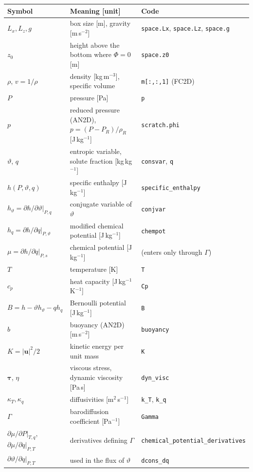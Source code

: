 \documentclass[11pt,a4paper]{article}
\newcommand{\vt}{\vartheta}                    %
\newcommand{\bu}{\mathbf{u}}
\newcommand{\btau}{\boldsymbol{\tau}}
\newcommand{\code}[1]{\texttt{#1}}
\begin{document}
\begin{table}[ht]
\centering\small
\begin{tabular}{p{4.3cm}p{6.0cm}p{4.9cm}}
\hline
Symbol & Meaning [unit] & Code \\ \hline
$L_x,L_z,g$ & box size [m], gravity [m\,s$^{-2}$] & \code{space.Lx}, \code{space.Lz}, \code{space.g} \\
$z_0$ & height above the bottom where $\Phi=0$ [m] & \code{space.z0} \\
$\rho$, $v=1/\rho$ & density [kg\,m$^{-3}$], specific volume & \code{m[:,:,1]} (FC2D) \\
$P$ & pressure [Pa] & \code{p} \\
$p$ & reduced pressure (AN2D), $p=(P-P_R)/\rho_R$ [J\,kg$^{-1}$] & \code{scratch.phi} \\
$\vt$, $q$ & entropic variable, solute fraction [kg\,kg$^{-1}$] & \code{consvar}, \code{q} \\
$h(P,\vt,q)$ & specific enthalpy [J\,kg$^{-1}$] & \code{specific\_enthalpy} \\
$h_\vt=\partial h/\partial\vt|_{P,q}$ & conjugate variable of $\vt$ & \code{conjvar} \\
$h_q=\partial h/\partial q|_{P,\vt}$ & modified chemical potential [J\,kg$^{-1}$] & \code{chempot} \\
$\mu=\partial h/\partial q|_{P,s}$ & chemical potential [J\,kg$^{-1}$] & (enters only through $\Gamma$) \\
$T$ & temperature [K] & \code{T} \\
$c_p$ & heat capacity [J\,kg$^{-1}$K$^{-1}$] & \code{Cp} \\
$B=h-\vt h_\vt-q h_q$ & Bernoulli potential [J\,kg$^{-1}$] & \code{B} \\
$b$ & buoyancy (AN2D) [m\,s$^{-2}$] & \code{buoyancy} \\
$K=|\bu|^2/2$ & kinetic energy per unit mass & \code{K} \\
$\btau$, $\eta$ & viscous stress, dynamic viscosity [Pa\,s] & \code{dyn\_visc} \\
$\kappa_T,\kappa_q$ & diffusivities [m$^2$\,s$^{-1}$] & \code{k\_T}, \code{k\_q} \\
$\Gamma$ & barodiffusion coefficient [Pa$^{-1}$] & \code{Gamma} \\
$\partial\mu/\partial P|_{T,q}$, $\partial\mu/\partial q|_{P,T}$ & derivatives defining $\Gamma$ & \code{chemical\_potential\_derivatives} \\
$\partial\vt/\partial q|_{P,T}$ & used in the flux of $\vt$ & \code{dcons\_dq} \\

\end{tabular}
\end{table}
\end{document}
